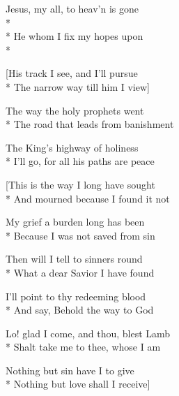 

\versemark
Jesus, my all, to heav’n is gone\\*
\vin{}\\*
He whom I fix my hopes upon\\*
\vin{}


[His track I see, and I’ll pursue\etc\\*
The narrow way till him I view\etc]

\versemark
The way the holy prophets went\etc\\*
The road that leads from banishment\etc

\versemark
The King’s highway of holiness\etc\\*
I’ll go, for all his paths are peace\etc

[This is the way I long have sought\etc\\*
And mourned because I found it not\etc

My grief a burden long has been\etc\\*
Because I was not saved from sin\etc

Then will I tell to sinners round\etc\\*
What a dear Savior I have found\etc

I’ll point to thy redeeming blood\etc\\*
And say, Behold the way to God\etc

Lo! glad I come, and thou, blest Lamb\etc\\*
Shalt take me to thee, whose I am\etc

Nothing but sin have I to give\etc\\*
Nothing but love shall I receive\etc]


